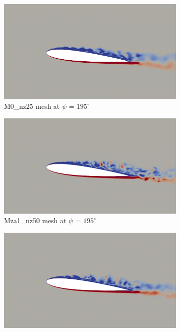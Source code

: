 \begin{figure}[H]
\centering
\begin{subfigure}[b]{0.475\textwidth}
\centering
\includegraphics[width=1\textwidth]{figures/adapt_strat/vorticity_plots/M0/phase_195.png}
\caption{M0\_nz25 mesh at $\psi$ = $195^\circ$}
\label{fig:M0_psi195}
\end{subfigure}
\begin{subfigure}[b]{0.475\textwidth}
\centering
\includegraphics[width=1\textwidth]{figures/adapt_strat/vorticity_plots/Mza1_50/phase_195.png}
\caption{Mza1\_nz50 mesh at $\psi$ = $195^\circ$}
\label{fig:Ma1_psi195}
\end{subfigure}
\begin{subfigure}[b]{0.475\textwidth}
\centering
\includegraphics[width=1\textwidth]{figures/adapt_strat/vorticity_plots/Msa1_50/phase_195.png}

\end{subfigure}
\end{figure}
